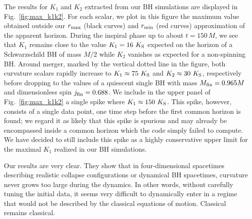\documentclass[floats,floatfix,showpacs,amssymb,prd,twocolumn,superscriptaddress,nofootinbib,nolongbibliography,reprint]{revtex4-2}
\begin{document}
The results for $K_1$ and $K_2$ extracted from our
BH simulations are displayed in Fig.~\ref{fig:max_k1k2}. For each scalar, we plot in this
figure the maximum value obtained outside our $r_{\rm max}$
(black curves) and $r_{\rm min}$ (red curves) approximation of the
apparent horizon. During the inspiral phase up to about
$t=150\,M$, we see that $K_1$ remains close to the value
$K_1=16~K_{\rm S}$ expected on the horizon of a Schwarzschild
BH of mass $M/2$ while $K_2$ vanishes as
expected for a non-spinning BH. Around merger,
marked by the vertical dotted line in the figure, both
curvature scalars rapidly increase to $K_1\approx 75~K_{\rm S}$
and $K_2\approx 30~K_{\rm S}$, respectively before dropping
to the values of a quiescent single BH with mass
$M_{\rm fin}=0.965M$ and dimensionless spin
$j_{\rm fin}=0.688$. We include in the upper panel
of Fig.~\ref{fig:max_k1k2} a single spike where $K_1\approx
150~K_{\rm S}$. This spike, however, consists of a single
data point, one time step before the first common horizon
is found; we regard it as likely that this spike is
spurious and may already be encompassed inside a common
horizon which the code simply failed to compute. We have decided
to still include this spike as a highly conservative upper
limit for the maximal $K_1$ realized in our BH simulations.



Our results are very clear. They show that in four-dimensional spacetimes describing realistic collapse configurations or dynamical BH spacetimes, curvature never grows too large during the dynamics. In other words, without carefully tuning the initial data, it seems very difficult to dynamically enter in a regime that would not be described by the classical equations of motion. Classical remains classical.
\end{document}
